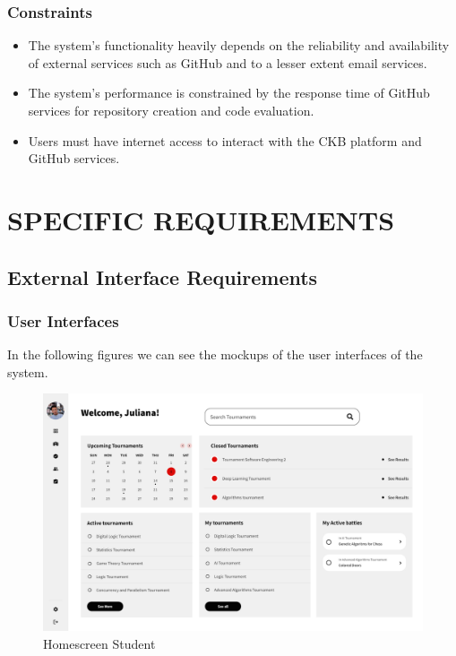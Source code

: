 \documentclass{article}
\begin{document}
\subsubsection{Constraints}

\begin{itemize}
\item The system's functionality heavily depends on the reliability and availability of external services such as GitHub and to a lesser extent email services.
\item The system's performance is constrained by the response time of GitHub services for repository creation and code evaluation.
\item Users must have internet access to interact with the CKB platform and GitHub services.
\end{itemize}

\section{SPECIFIC REQUIREMENTS}
\subsection{External Interface Requirements}
\subsubsection{User Interfaces}

In the following figures we can see the mockups of the user interfaces of the system. 

\begin{figure}[!h]
    \centering
    \includegraphics[width=1\textwidth]{images/UI/Homescreen Student.png}
    \caption{Homescreen Student}
    \label{fig:HomescreenStudent}
\end{figure}
\end{document}
